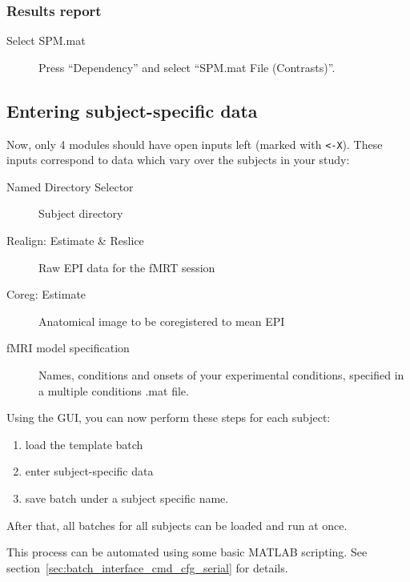 \subsubsection*{Results report}

\begin{description}
\item[Select SPM.mat] Press ``Dependency'' and select ``SPM.mat File
  (Contrasts)''. 
\end{description}

\subsection{Entering subject-specific data}

Now, only 4 modules should have open inputs left (marked with \verb|<-X|). These
inputs correspond to data which vary over the subjects in your study:
\begin{description}
\item[Named Directory Selector] Subject directory
\item[Realign: Estimate \& Reslice] Raw EPI data for the fMRT session
\item[Coreg: Estimate] Anatomical image to be coregistered to mean EPI
\item[fMRI model specification] Names, conditions and onsets of your
  experimental conditions, specified in a multiple conditions .mat file.
\end{description}

Using the GUI, you can now perform these steps for each subject:
\begin{enumerate}
\item load the template batch
\item enter subject-specific data
\item save batch under a subject specific name.
\end{enumerate}

After that, all batches for all subjects can be loaded and run at once.

This process can be automated using some basic MATLAB scripting. See
section~\ref{sec:batch_interface_cmd_cfg_serial} for details.

